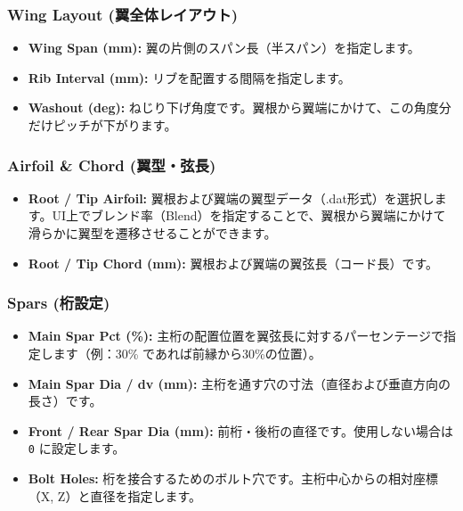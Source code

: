 \documentclass[11pt,a4paper]{ltjsarticle}
\begin{document}
\subsubsection{Wing Layout (翼全体レイアウト)}
\begin{itemize}
    \item \textbf{Wing Span (mm):} 翼の片側のスパン長（半スパン）を指定します。
    \item \textbf{Rib Interval (mm):} リブを配置する間隔を指定します。
    \item \textbf{Washout (deg):} ねじり下げ角度です。翼根から翼端にかけて、この角度分だけピッチが下がります。
\end{itemize}

\subsubsection{Airfoil \& Chord (翼型・弦長)}
\begin{itemize}
    \item \textbf{Root / Tip Airfoil:} 翼根および翼端の翼型データ（.dat形式）を選択します。UI上でブレンド率（Blend）を指定することで、翼根から翼端にかけて滑らかに翼型を遷移させることができます。
    \item \textbf{Root / Tip Chord (mm):} 翼根および翼端の翼弦長（コード長）です。
\end{itemize}

\subsubsection{Spars (桁設定)}
\begin{itemize}
    \item \textbf{Main Spar Pct (\%):} 主桁の配置位置を翼弦長に対するパーセンテージで指定します（例：30\% であれば前縁から30\%の位置）。
    \item \textbf{Main Spar Dia / dv (mm):} 主桁を通す穴の寸法（直径および垂直方向の長さ）です。
    \item \textbf{Front / Rear Spar Dia (mm):} 前桁・後桁の直径です。使用しない場合は \texttt{0} に設定します。
    \item \textbf{Bolt Holes:} 桁を接合するためのボルト穴です。主桁中心からの相対座標（X, Z）と直径を指定します。
\end{itemize}
\end{document}
